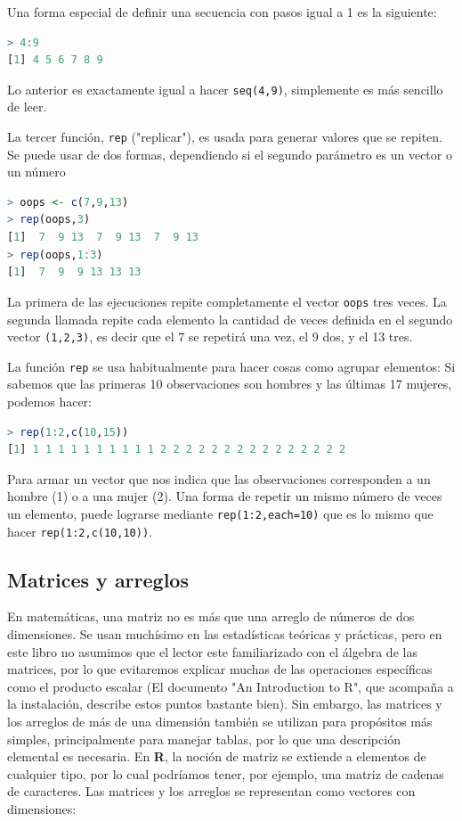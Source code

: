 Una forma especial de definir una secuencia con pasos igual a 1 es la siguiente:

\begin{lstlisting}[language=R]
> 4:9
[1] 4 5 6 7 8 9
\end{lstlisting}

Lo anterior es exactamente igual a hacer \texttt{seq(4,9)}, simplemente es más
sencillo de leer.

La tercer función, \texttt{rep} ("replicar"), es usada para generar valores que
se repiten. Se puede usar de dos formas, dependiendo si el segundo parámetro es
un vector o un número

\begin{lstlisting}[language=R]
> oops <- c(7,9,13)
> rep(oops,3)
[1]  7  9 13  7  9 13  7  9 13
> rep(oops,1:3)
[1]  7  9  9 13 13 13
\end{lstlisting}

La primera de las ejecuciones repite completamente el vector \texttt{oops} tres
veces.  La segunda llamada repite cada elemento la cantidad de veces definida
en el segundo vector \texttt{(1,2,3)}, es decir que el 7 se repetirá una vez,
el 9 dos, y el 13 tres.

La función \texttt{rep} se usa habitualmente para hacer cosas como agrupar elementos: Si
sabemos que las primeras 10 observaciones son hombres y las últimas 17 mujeres,
podemos hacer:

\begin{lstlisting}[language=R]
> rep(1:2,c(10,15))
[1] 1 1 1 1 1 1 1 1 1 1 2 2 2 2 2 2 2 2 2 2 2 2 2 2 2
\end{lstlisting}

Para armar un vector que nos indica que las observaciones corresponden a un
hombre (1) o a una mujer (2).  Una forma de repetir un mismo número de veces un
elemento, puede lograrse mediante \texttt{rep(1:2,each=10)} que es lo mismo que
hacer \texttt{rep(1:2,c(10,10))}.

\subsection{Matrices y arreglos}

En matemáticas, una matriz no es más que una arreglo de números de dos
dimensiones. Se usan muchísimo en las estadísticas teóricas y prácticas, pero
en este libro no asumimos que el lector este familiarizado con el álgebra de
las matrices, por lo que evitaremos explicar muchas de las operaciones
específicas como el producto escalar (El documento "An Introduction to R", que
acompaña a la instalación, describe estos puntos bastante bien). Sin embargo,
las matrices y los arreglos de más de una dimensión también se utilizan para
propósitos más simples, principalmente para manejar tablas, por lo que una
descripción elemental es necesaria. En \textbf{R}, la noción de matriz se
extiende a elementos de cualquier tipo, por lo cual podríamos tener, por
ejemplo, una matriz de cadenas de caracteres. Las matrices y los arreglos se
representan como vectores con dimensiones:



